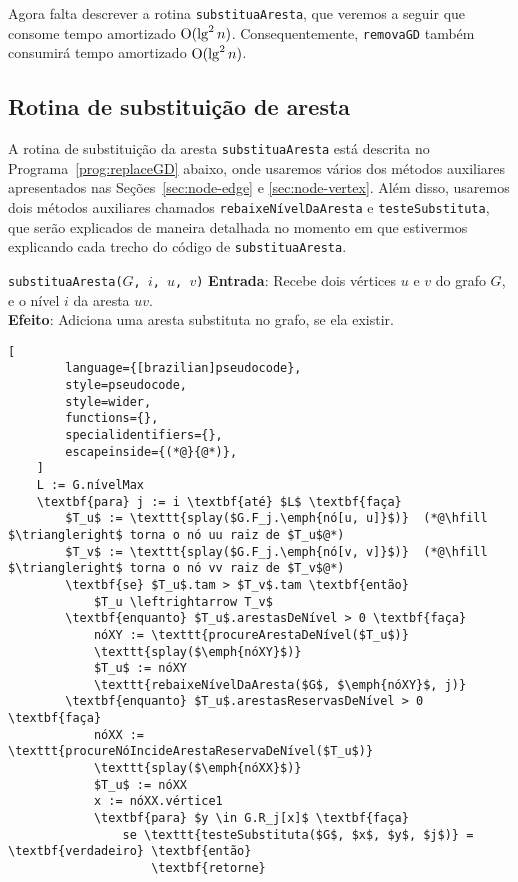 Agora falta descrever a rotina \texttt{substituaAresta}, que veremos a seguir que consome tempo amortizado $\mathrm{O}(\lg^2 n)$. Consequentemente, \texttt{removaGD} também consumirá tempo amortizado $\mathrm{O}(\lg^2 n)$.

\subsection{Rotina de substituição de aresta}
\label{sec:replace-edge}

A rotina de substituição da aresta \texttt{substituaAresta} está descrita no Programa~\ref{prog:replaceGD} abaixo, onde usaremos vários dos métodos auxiliares apresentados nas Seções~\ref{sec:node-edge} e \ref{sec:node-vertex}. Além disso, usaremos dois métodos auxiliares chamados \texttt{rebaixeNívelDaAresta} e \texttt{testeSubstituta}, que serão explicados de maneira detalhada no momento em que estivermos explicando cada trecho do código de \texttt{substituaAresta}.

\begin{programruledcaption}{\texttt{substituaAresta($G$, $i$, $u$, $v$)} \label{prog:replaceGD}}
    \noindent\textbf{Entrada}: Recebe dois vértices $u$ e $v$ do grafo $G$, e o nível $i$ da aresta $uv$. \\
    \noindent\textbf{Efeito}: Adiciona uma aresta substituta no grafo, se ela existir.
    \vspace{-0.5\baselineskip}
    \begin{lstlisting}[
        language={[brazilian]pseudocode},
        style=pseudocode,
        style=wider,
        functions={},
        specialidentifiers={},
        escapeinside={(*@}{@*)},
    ]
    L := G.nívelMax
    \textbf{para} j := i \textbf{até} $L$ \textbf{faça}
        $T_u$ := \texttt{splay($G.F_j.\emph{nó[u, u]}$)}  (*@\hfill $\triangleright$ torna o nó uu raiz de $T_u$@*)
        $T_v$ := \texttt{splay($G.F_j.\emph{nó[v, v]}$)}  (*@\hfill $\triangleright$ torna o nó vv raiz de $T_v$@*)    
        \textbf{se} $T_u$.tam > $T_v$.tam \textbf{então}
            $T_u \leftrightarrow T_v$
        \textbf{enquanto} $T_u$.arestasDeNível > 0 \textbf{faça} 
            nóXY := \texttt{procureArestaDeNível($T_u$)}
            \texttt{splay($\emph{nóXY}$)}
            $T_u$ := nóXY
            \texttt{rebaixeNívelDaAresta($G$, $\emph{nóXY}$, j)}
        \textbf{enquanto} $T_u$.arestasReservasDeNível > 0     \textbf{faça}
            nóXX := \texttt{procureNóIncideArestaReservaDeNível($T_u$)}
            \texttt{splay($\emph{nóXX}$)}
            $T_u$ := nóXX
            x := nóXX.vértice1
            \textbf{para} $y \in G.R_j[x]$ \textbf{faça}
                se \texttt{testeSubstituta($G$, $x$, $y$, $j$)} = \textbf{verdadeiro} \textbf{então} 
                    \textbf{retorne}
    \end{lstlisting}
    \vspace{-0.5\baselineskip}
\end{programruledcaption}

